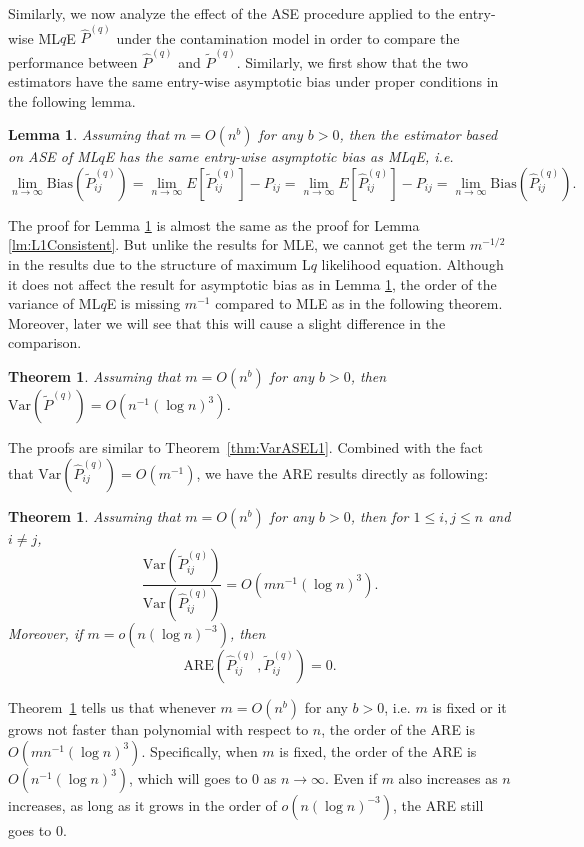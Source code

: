 \documentclass[a4paper]{article}
\newtheorem{lemma}[fact]{Lemma}
\newtheorem{theorem}[fact]{Theorem}
\renewcommand{\hat}{\widehat}
\begin{document}
Similarly, we now analyze the effect of the ASE procedure applied to the entry-wise ML$q$E $\hat{P}^{(q)}$ under the contamination model in order to compare the performance between $\hat{P}^{(q)}$ and $\widetilde{P}^{(q)}$. Similarly, we first show that the two estimators have the same entry-wise asymptotic bias under proper conditions in the following lemma.

\begin{lemma}
\label{lm:LqConsistent}
Assuming that $m = O(n^b)$ for any $b > 0$, then the estimator based on ASE of ML$q$E has the same entry-wise asymptotic bias as ML$q$E, i.e.
\[
	\lim_{n \to \infty} \mathrm{Bias}(\widetilde{P}_{ij}^{(q)}) = \lim_{n \to \infty} E[\widetilde{P}_{ij}^{(q)}] - P_{ij} = \lim_{n \to \infty} E[\hat{P}^{(q)}_{ij}] - P_{ij}
    = \lim_{n \to \infty} \mathrm{Bias}(\hat{P}_{ij}^{(q)}).
\]
\end{lemma}

The proof for Lemma \ref{lm:LqConsistent} is almost the same as the proof for Lemma \ref{lm:L1Consistent}. But unlike the results for MLE, we cannot get the term $m^{-1/2}$ in the results due to the structure of maximum L$q$ likelihood equation. Although it does not affect the result for asymptotic bias as in Lemma \ref{lm:LqConsistent}, the order of the variance of ML$q$E is missing $m^{-1}$ compared to MLE as in the following theorem. Moreover, later we will see that this will cause a slight difference in the comparison. 

\begin{theorem}
\label{thm:VarASELq}
Assuming that $m = O(n^b)$ for any $b > 0$, then $\mathrm{Var}(\widetilde{P}^{(q)}) = O(n^{-1} (\log n)^3)$.
\end{theorem}

The proofs are similar to Theorem~\ref{thm:VarASEL1}. Combined with the fact that $\mathrm{Var}(\hat{P}_{ij}^{(q)}) = O(m^{-1})$, we have the ARE results directly as following:

\begin{theorem}
\label{thm:ARELq}
Assuming that $m = O(n^b)$ for any $b > 0$,  then for $1 \le i, j \le n$ and $i \ne j$,
\[
	\frac{\mathrm{Var}(\widetilde{P}_{ij}^{(q)})}{\mathrm{Var}(\hat{P}_{ij}^{(q)})}
    = O(m n^{-1} (\log n)^3).
\]
Moreover, if $m = o(n (\log n)^{-3})$, then
\[
	\mathrm{ARE}(\hat{P}_{ij}^{(q)}, \widetilde{P}_{ij}^{(q)}) = 0.
\]
\end{theorem}

Theorem~\ref{thm:ARELq} tells us that whenever $m = O(n^b)$ for any $b > 0$, i.e. $m$ is fixed or it grows not faster than polynomial with respect to $n$, the order of the ARE is $O(m n^{-1} (\log n)^3)$. Specifically, when $m$ is fixed, the order of the ARE is $O(n^{-1} (\log n)^3)$, which will goes to 0 as $n \to \infty$. Even if $m$ also increases as $n$ increases, as long as it grows in the order of $o(n (\log n)^{-3})$, the ARE still goes to 0. 
\end{document}

